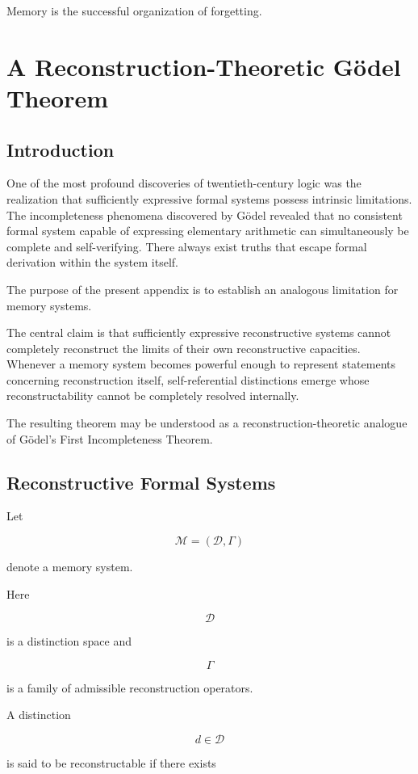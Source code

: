 \documentclass[12pt,oneside]{book}
\theoremstyle{plain} \newtheorem{theorem}{Theorem}[chapter] \newtheorem{lemma}[theorem]{Lemma} \newtheorem{proposition}[theorem]{Proposition} \newtheorem{corollary}[theorem]{Corollary}
\theoremstyle{definition} \newtheorem{definition}[theorem]{Definition} \newtheorem{axiom}[theorem]{Axiom} \newtheorem{construction}[theorem]{Construction}
\theoremstyle{remark} \newtheorem{remark}[theorem]{Remark} \newtheorem{example}[theorem]{Example}
\newcommand{\D}{\mathcal{D}} \newcommand{\R}{\mathcal{R}} \newcommand{\F}{\mathcal{F}} \newcommand{\U}{\mathcal{U}} \newcommand{\M}{\mathcal{M}} \newcommand{\G}{\Gamma}
\begin{document}
Memory is the successful organization of forgetting.

\chapter{A Reconstruction-Theoretic Gödel Theorem}

\section{Introduction}

One of the most profound discoveries of twentieth-century logic was the realization that sufficiently expressive formal systems possess intrinsic limitations. The incompleteness phenomena discovered by Gödel revealed that no consistent formal system capable of expressing elementary arithmetic can simultaneously be complete and self-verifying. There always exist truths that escape formal derivation within the system itself.

The purpose of the present appendix is to establish an analogous limitation for memory systems.

The central claim is that sufficiently expressive reconstructive systems cannot completely reconstruct the limits of their own reconstructive capacities. Whenever a memory system becomes powerful enough to represent statements concerning reconstruction itself, self-referential distinctions emerge whose reconstructability cannot be completely resolved internally.

The resulting theorem may be understood as a reconstruction-theoretic analogue of Gödel's First Incompleteness Theorem.

\section{Reconstructive Formal Systems}

Let

\[
\mathcal M
=
(\D,\Gamma)
\]

denote a memory system.

Here

\[
\D
\]

is a distinction space and

\[
\Gamma
\]

is a family of admissible reconstruction operators.

A distinction

\[
d\in\D
\]

is said to be reconstructable if there exists
\end{document}
